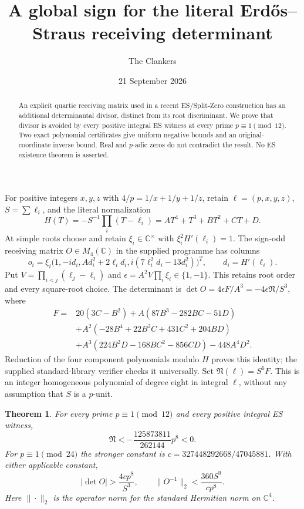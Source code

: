 \documentclass[11pt,reqno]{amsart}
\title{A global sign for the literal Erd\H{o}s--Straus receiving determinant}
\author{The Clankers}\date{21 September 2026}
\newtheorem{theorem}{Theorem}\newtheorem{lemma}{Lemma}
\begin{document}
\begin{abstract}
An explicit quartic receiving matrix used in a recent ES/Split-Zero construction
has an additional determinantal divisor, distinct from its root discriminant.
We prove that divisor is avoided by every positive integral ES witness at every
prime $p\equiv1\pmod{12}$. Two exact polynomial certificates give uniform
negative bounds and an original-coordinate inverse bound. Real and $p$-adic
zeros do not contradict the result. No ES existence theorem is asserted.
\end{abstract}\maketitle

For positive integers $x,y,z$ with $4/p=1/x+1/y+1/z$, retain
$\ell=(p,x,y,z)$, $S=\sum\ell_i$, and the literal normalization
\[
 H(T)=-S^{-1}\prod_i(T-\ell_i)=AT^4+T^3+BT^2+CT+D.
\]
At simple roots choose and retain $\xi_i\in\mathbb C^\times$ with
$\xi_i^2H'(\ell_i)=1$. The sign-odd receiving matrix
$O\in M_4(\mathbb C)$ in the supplied programme has columns
\[
 o_i=\xi_i\bigl(1,-id_i,Ad_i^2+2\ell_id_i,
                         i(7\ell_i^2d_i-13d_i^2)\bigr)^T,
 \qquad d_i=H'(\ell_i).
\]
Put $V=\prod_{i<j}(\ell_j-\ell_i)$ and
$\epsilon=A^2V\prod_i\xi_i\in\{1,-1\}$. This retains root order and every
square-root choice. The determinant is
$\det O=4\epsilon F/A^3=-4\epsilon\mathfrak N/S^3$, where
\begin{align*}
 F={}&20(3C-B^2)+A(87B^3-282BC-51D)\\
 &+A^2(-28B^4+22B^2C+431C^2+204BD)\\
 &+A^3(224B^2D-168BC^2-856CD)-448A^4D^2.
\end{align*}
Reduction of the four component polynomials modulo $H$ proves this identity;
the supplied standard-library verifier checks it universally. Set
$\mathfrak N(\ell)=S^6F$. This is an integer homogeneous polynomial of degree
eight in integral $\ell$, without any assumption that $S$ is a $p$-unit.

\begin{theorem}
For every prime $p\equiv1\pmod{12}$ and every positive integral ES witness,
\[
 \boxed{\mathfrak N<-\frac{125873811}{262144}p^8<0.}
\]
For $p\equiv1\pmod{24}$ the stronger constant is
$c=327448292668/47045881$. With either applicable constant,
\[
 \boxed{|\det O|>\frac{4cp^8}{S^3},\qquad
             \|O^{-1}\|_2<\frac{360S^9}{cp^8}.}
\]
Here $\|\cdot\|_2$ is the operator norm for the standard Hermitian norm on
$\mathbb C^4$.
\end{theorem}
\end{document}
